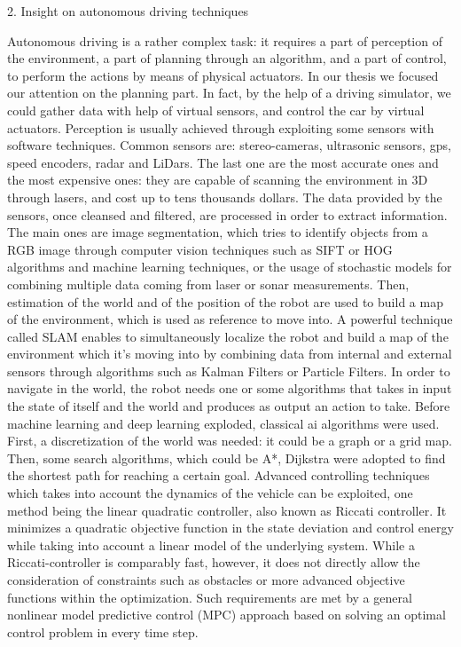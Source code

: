 2. Insight on autonomous driving techniques

Autonomous driving is a rather complex task: it requires a part of perception of the environment, a part of planning through an algorithm, and a part of control, to perform the actions by means of physical actuators. In our thesis we focused our attention on the planning part. In fact, by the help of a driving simulator, we could gather data with help of virtual sensors, and control the car by virtual actuators.
Perception is usually achieved through exploiting some sensors with software techniques.
Common sensors are: stereo-cameras, ultrasonic sensors, gps, speed encoders, radar and LiDars. The last one are the most accurate ones and the most expensive ones: they are capable of scanning the environment in 3D through lasers, and cost up to tens thousands dollars.
The data provided by the sensors, once cleansed and filtered, are processed in order to extract information. The main ones are image segmentation, which tries to identify objects from a RGB image through computer vision techniques such as SIFT or HOG algorithms and machine learning techniques, or the usage of stochastic models for combining multiple data coming from laser or sonar measurements.
Then, estimation of the world and of the position of the robot are used to build a map of the environment, which is used as reference to move into.
A powerful technique called SLAM enables to simultaneously localize the robot and build a map of the environment which it's moving into by combining data from internal and external sensors through algorithms such as Kalman Filters or Particle Filters.
In order to navigate in the world, the robot needs one or some algorithms that takes in input the state of itself and the world and produces as output an action to take.
Before machine learning and deep learning exploded, classical ai algorithms were used.
First, a discretization of the world was needed: it could be a graph or a grid map. Then, some search algorithms, which could be A*, Dijkstra were adopted to find the shortest path for reaching a certain goal.
Advanced controlling techniques which takes into account the dynamics of the vehicle can be exploited, one method being the linear quadratic controller, also known as Riccati controller. It minimizes a quadratic objective function in the state deviation and control energy while taking into account a linear model of the underlying system.
While a Riccati-controller is comparably fast, however, it does not directly allow the consideration of constraints such as obstacles or more advanced objective functions within
the optimization. Such requirements are met by a general nonlinear model predictive control (MPC) approach based on solving an optimal control problem in every time step.	

